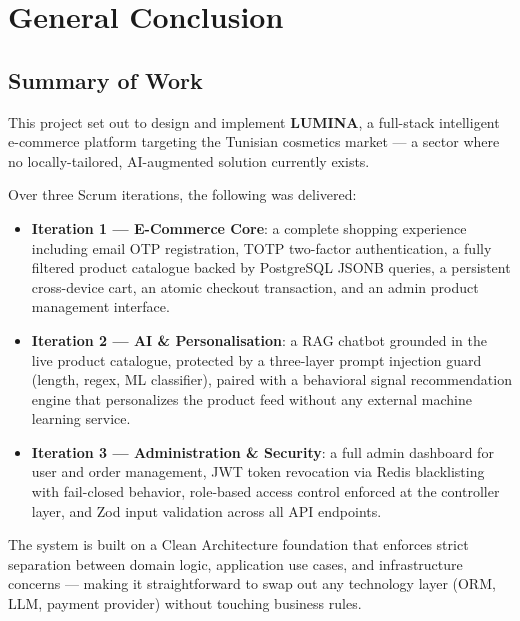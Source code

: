 \chapter*{General Conclusion}

\section*{Summary of Work}

This project set out to design and implement \textbf{LUMINA}, a full-stack
intelligent e-commerce platform targeting the Tunisian cosmetics market ---
a sector where no locally-tailored, AI-augmented solution currently exists.

Over three Scrum iterations, the following was delivered:

\begin{itemize}
  \item \textbf{Iteration 1 --- E-Commerce Core}: a complete shopping experience
        including email OTP registration, TOTP two-factor authentication,
        a fully filtered product catalogue backed by PostgreSQL JSONB queries,
        a persistent cross-device cart, an atomic checkout transaction, and
        an admin product management interface.

  \item \textbf{Iteration 2 --- AI \& Personalisation}: a RAG chatbot grounded
        in the live product catalogue, protected by a three-layer prompt
        injection guard (length, regex, ML classifier), paired with a
        behavioral signal recommendation engine that personalizes the
        product feed without any external machine learning service.

  \item \textbf{Iteration 3 --- Administration \& Security}: a full admin
        dashboard for user and order management, JWT token revocation via
        Redis blacklisting with fail-closed behavior, role-based access
        control enforced at the controller layer, and Zod input validation
        across all API endpoints.
\end{itemize}

The system is built on a Clean Architecture foundation that enforces strict
separation between domain logic, application use cases, and infrastructure
concerns --- making it straightforward to swap out any technology layer
(ORM, LLM, payment provider) without touching business rules.

